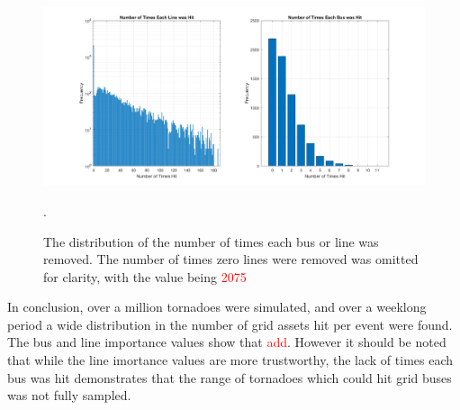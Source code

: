 \documentclass[12pt]{article}
\begin{document}
\begin{figure}[H]
    \centering %
    \includegraphics[width=\textwidth]{Timeseachitemhit.png}
    \caption[Distribution of the number of times each bus or line was removed]{The distribution of the number of times each bus or line was removed. The number of times zero lines were removed was omitted for clarity, with the value being \textcolor{red}{2075}}.
    \label{fig:Timeseachitemhit}
\end{figure}

In conclusion, over a million tornadoes were simulated, and over a weeklong period a wide distribution in the number of grid assets hit per event were found. The bus and line importance values show that \textcolor{red}{add}. However it should be noted that while the line imortance values are more trustworthy, the lack of times each bus was hit demonstrates that the range of tornadoes which could hit grid buses was not fully sampled. 


\newpage
\end{document}
